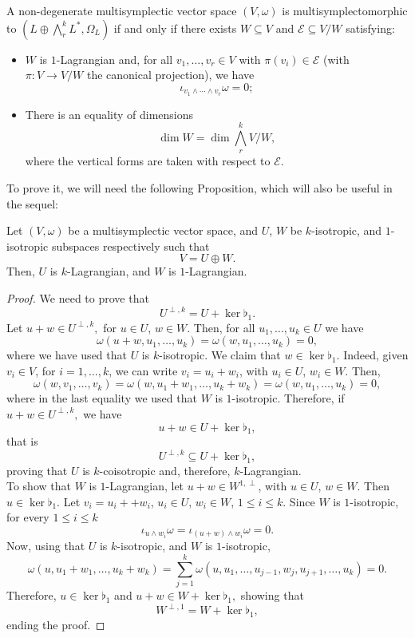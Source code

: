 \begin{theorem}\label{thm:type(kr)} A non-degenerate multisymplectic vector space $(V, \omega)$ is multisymplectomorphic to $(L \oplus \bigwedge^k_r L^\ast, \Omega_L)$ if and only if there exists $ W \subseteq V$ and $\mathcal{E} \subseteq V/W$ satisfying:
\begin{itemize}
    \item $W$ is $1$-Lagrangian and, for all $v_1, \dots, v_r \in V$ with $\pi(v_i) \in \mathcal{E}$ (with $\pi: V \rightarrow V/W$ the canonical projection), we have $$\iota_{ v_1 \wedge \cdots \wedge v_r} \omega = 0;$$
    \item There is an equality of dimensions $$\dim W = \dim \bigwedge ^k_r V/W,$$ where the vertical forms are taken with respect to $\mathcal{E}.$
\end{itemize}
\end{theorem}
To prove it, we will need the following Proposition, which will also be useful in the sequel:

\begin{proposition}\label{isotropicdecomposition} Let $(V, \omega)$ be a multisymplectic vector space, and $U$, $W$ be $k$-isotropic, and $1$-isotropic subspaces respectively such that
$$V = U \oplus W.$$
Then, $U$ is $k$-Lagrangian, and $W$ is $1$-Lagrangian.
\end{proposition}
\begin{proof} We need to prove that $$U^{\perp, k} = U + \ker \flat_1.$$ Let $u + w \in U^{\perp, k},$ for $u \in U$, $w \in W$. Then, for all $u_1, \dots, u_k \in U$ we have $$\omega(u + w, u_1, \dots, u_k) = \omega(w, u_1, \dots, u_k) = 0,$$ where we have used that $U$ is $k$-isotropic. We claim that $w \in \ker \flat_1.$ Indeed, given $v_i \in V$, for $i = 1, \dots, k$, we can write $v_i = u_i + w_i$, with $u_i \in U$, $w_i \in W$. Then, $$\omega(w, v_1, \dots, v_k) = \omega(w, u_1 + w_1, \dots, u_k +w_k) = \omega(w, u_1, \dots, u_k) = 0,$$ where in the last equality we used that $W$ is $1$-isotropic. Therefore, if $u + w \in U^{\perp, k},$ we have $$u + w \in U +\ker \flat_1,$$ that is $$U^{\perp, k} \subseteq U + \ker \flat_1,$$ proving that $U$ is $k$-coisotropic and, therefore, $k$-Lagrangian.\\

\noindent To show that $W$ is $1$-Lagrangian, let $u + w \in W^{1, \perp}$, with $u \in U$, $w \in W$. Then $u \in \ker \flat_1.$ Let $v_i = u_i + + w_i$, $u_i \in U$, $w_i \in W$, $1 \leq i \leq k$. Since $W$ is $1$-isotropic, for every $1 \leq i \leq k$ $$\iota_{u \wedge w_i} \omega = \iota_{(u + w) \wedge w_i} \omega = 0.$$ Now, using that $U$ is $k$-isotropic, and $W$ is $1$-isotropic,
$$\omega(u, u_1 + w_1, \dots, u_k + w_k) = \sum_{j = 1}^{k} \omega(u, u_1,\dots, u_{j-1}, w_j,u_{j+1}, \dots, u_k) = 0.$$
Therefore, $u \in \ker \flat_1$ and $u + w \in W + \ker \flat_1,$ showing that $$W^{\perp, 1} = W + \ker \flat_1,$$ ending the proof.
\end{proof}

